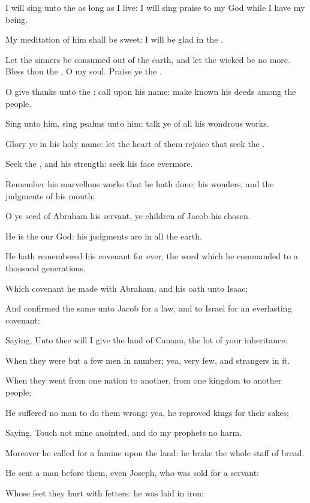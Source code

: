 \Verse I will sing unto the \LORD as long as I live: I will sing praise to my God while I have my being.

\Verse My meditation of him shall be sweet: I will be glad in the \LORD.

\Verse Let the sinners be consumed out of the earth, and let the wicked be no more. Bless thou the \LORD, O my soul. Praise ye the \LORD.




\Chapter
\Verse O give thanks unto the \LORD; call upon his name: make known his deeds among the people.

\Verse Sing unto him, sing psalms unto him: talk ye of all his wondrous works.

\Verse Glory ye in his holy name: let the heart of them rejoice that seek the \LORD.

\Verse Seek the \LORD, and his strength: seek his face evermore.

\Verse Remember his marvellous works that he hath done; his wonders, and the judgments of his mouth;

\Verse O ye seed of Abraham his servant, ye children of Jacob his chosen.

\Verse He is the \LORD our God: his judgments are in all the earth.

\Verse He hath remembered his covenant for ever, the word which he commanded to a thousand generations.

\Verse Which covenant he made with Abraham, and his oath unto Isaac;

\Verse And confirmed the same unto Jacob for a law, and to Israel for an everlasting covenant:

\Verse Saying, Unto thee will I give the land of Canaan, the lot of your inheritance:

\Verse When they were but a few men in number; yea, very few, and strangers in it.

\Verse When they went from one nation to another, from one kingdom to another people;

\Verse He suffered no man to do them wrong: yea, he reproved kings for their sakes;

\Verse Saying, Touch not mine anointed, and do my prophets no harm.

\Verse Moreover he called for a famine upon the land: he brake the whole staff of bread.

\Verse He sent a man before them, even Joseph, who was sold for a servant:

\Verse Whose feet they hurt with fetters: he was laid in iron:

